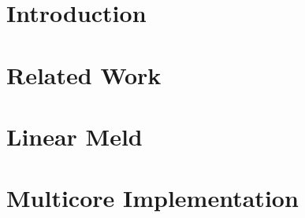 \documentclass[12pt]{cmuthesis}
\theoremstyle{indented}
\begin{document}
 

%
\pagestyle{plain} %







\tableofcontents
\listoffigures
\listoftables
\renewcommand{\listtheoremname}{List of Equations}
\listoftheorems

\mainmatter


%
%
%
%
%

\chapter{Introduction}


\chapter{Related Work}


\chapter{Linear Meld}



\chapter{Multicore Implementation}

\end{document}
